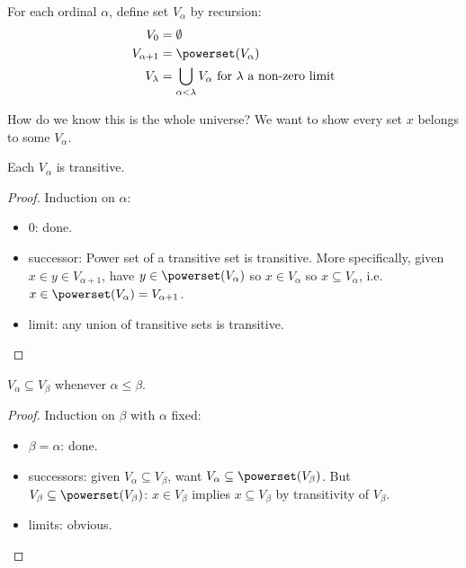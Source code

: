\documentclass[a4paper]{article}
\begin{document}
\begin{definition}
  For each ordinal \(\alpha\), define set \(V_\alpha\) by recursion:
  \begin{align*}
    V_0 &= \emptyset \\
    V_{\alpha + 1} &= \powerset(V_\alpha) \\
    V_\lambda &= \bigcup_{\alpha < \lambda} V_\alpha \text{ for \(\lambda\) a non-zero limit}
  \end{align*}
\end{definition}

How do we know this is the whole universe? We want to show every set \(x\) belongs to some \(V_\alpha\).

\begin{lemma}
  Each \(V_\alpha\) is transitive.
\end{lemma}

\begin{proof}
  Induction on \(\alpha\):
  \begin{itemize}
  \item \(0\): done.
  \item successor: Power set of a transitive set is transitive. More specifically, given \(x \in y \in V_{\alpha + 1}\), have \(y \in \powerset(V_\alpha)\) so \(x \in V_\alpha\) so \(x \subseteq V_\alpha\), i.e.\ \(x \in \powerset(V_\alpha) = V_{\alpha + 1}\).
  \item limit: any union of transitive sets is transitive.
  \end{itemize}
\end{proof}

\begin{lemma}
  \(V_\alpha \subseteq V_\beta\) whenever \(\alpha \leq \beta\).
\end{lemma}

\begin{proof}
  Induction on \(\beta\) with \(\alpha\) fixed:
  \begin{itemize}
  \item \(\beta = \alpha\): done.
  \item successors: given \(V_\alpha \subseteq V_\beta\), want \(V_\alpha \subseteq \powerset(V_\beta)\). But \(V_\beta \subseteq \powerset(V_\beta)\): \(x \in V_\beta\) implies \(x \subseteq V_\beta\) by transitivity of \(V_\beta\).
  \item limits: obvious.
  \end{itemize}
\end{proof}
\end{document}
